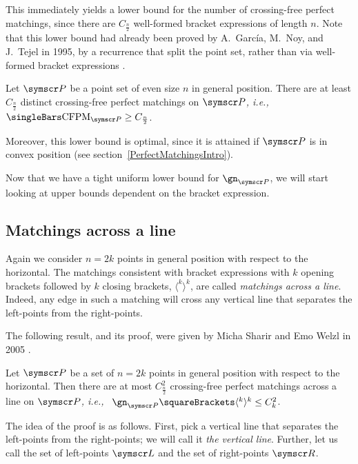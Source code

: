 \documentclass[10pt, a4paper, twoside]{basestyle}
\newcommand{\idest}{\emph{, i.e.,\ }}
\DeclareMathOperator{\CFPM}{CFPM}
\newcommand{\pointset}{\symscr}
\begin{document}
This immediately yields a lower bound for the number of crossing-free perfect matchings, since
there are $C_{\frac n 2}$ well-formed bracket expressions of length $n$.
Note that this lower bound had already been proved by A.~García, M.~Noy, and J.~Tejel in 1995,
by a recurrence that split the point set, rather than via well-formed bracket expressions
\cite{GarciaNoyTejel2000}.
\begin{corollary}
Let $\pointset P$ be a point set of even size $n$ in general position. There are at least $C_{\frac n 2}$ distinct
crossing-free perfect matchings on $\pointset P$\idest $\Cardinality{\CFPM_{\pointset P}} \geq C_{\frac n 2}$.
\end{corollary}
Moreover, this lower bound is optimal, since it is attained if $\pointset P$ is in convex position (see
section~\ref{PerfectMatchingsIntro}).

Now that we have a tight uniform lower bound for $\gn_{\pointset P}$, we will start looking at upper bounds
dependent on the bracket expression.
\subsection{Matchings across a line}
Again we consider $n=2k$ points in general position with respect to the horizontal.
The matchings consistent with bracket expressions with $k$ opening brackets followed
by $k$ closing brackets, $\langle^k\rangle^k$, are called \emph{matchings
across a line}. Indeed, any edge in such a matching will cross any vertical line that separates
the left-points from the right-points.

The following result, and its proof, were given by Micha Sharir and Emo Welzl in 2005 \cite{SharirWelzl2006}.
\NoEndMark
\begin{theorem}
Let $\pointset P$ be a set of $n=2k$ points in general position with respect to the horizontal.
Then there are at most $C_{\frac n 2}^2$ crossing-free perfect matchings across a line on $\pointset P$\idest
$\gn_{\pointset P}\of {\langle^k\rangle^k} \leq C_k^2$.
\end{theorem}
The idea of the proof is as follows.
First, pick a vertical line that separates the left-points from the right-points;
we will call it \emph{the vertical line}.
Further, let us call the set of left-points $\pointset L$ and the set of right-points $\pointset R$.
\end{document}
